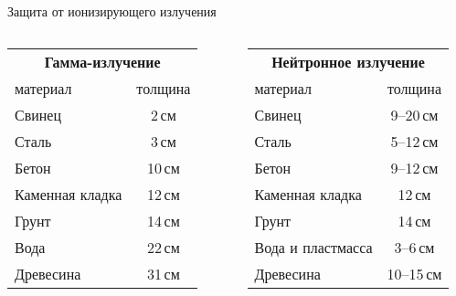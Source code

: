 \documentclass[unicode,lefteqn,c,hyperref={pdfpagelabels=false}]{beamer}
\begin{document}
\begin{frame}{Защита от ионизирующего излучения}


\begin{columns}
        \begin{tabular}{l|c}
        \multicolumn{2}{c}{\textbf{Гамма-излучение}}\\
        материал & толщина\\ 
        \hline
        Свинец & 2\,см \\
        Сталь & 3\,см \\
        Бетон & 10\,см  \\ 
        Каменная кладка & 12\,см \\
        Грунт & 14\,см \\
        Вода & 22\,см \\
        Древесина & 31\,см \\
        \end{tabular}
        \begin{tabular}{l|c}
        \multicolumn{2}{c}{\textbf{Нейтронное излучение}} \\
        материал & толщина\\ 
        \hline
        Свинец & 9--20\,см \\
        Сталь & 5--12\,см \\
        Бетон & 9--12\,см  \\
        Каменная кладка & 12\,см \\
        Грунт & 14\,см \\
        Вода и пластмасса  & 3--6\,см \\
        Древесина & 10--15\,см \\
        \end{tabular}

\end{columns}
\end{frame}
\end{document}
